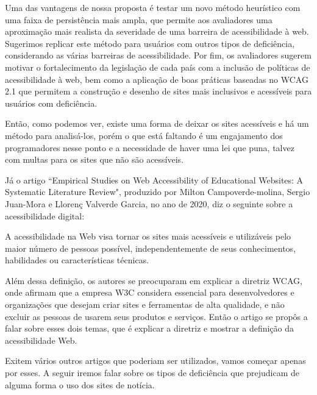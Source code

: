 \documentclass[a4paper]{article}
\begin{document}
\begin{titlepage}
\hspace{0.19\textwidth} %
\begin{minipage}{0.75\textwidth}
	\fontsize{10pt}{0pt}\selectfont
	Uma das vantagens de nossa proposta é testar um novo método heurístico com uma faixa de persistência mais ampla, que permite aos avaliadores uma aproximação mais realista da severidade de uma barreira de acessibilidade à web. Sugerimos replicar este método para usuários com outros tipos de deficiência, considerando as várias barreiras de acessibilidade. Por fim, os avaliadores sugerem motivar o fortalecimento da legislação de cada país com a inclusão de políticas de acessibilidade à web, bem como a aplicação de boas práticas baseadas no WCAG 2.1 que permitem a construção e desenho de sites mais inclusivos e acessíveis para usuários com deficiência.\\[0.5cm]
\end{minipage}

Então, como podemos ver, existe uma forma de deixar os sites acessíveis e há um método para analisá-los, porém o que está faltando é um engajamento dos programadores nesse ponto e a necessidade de haver uma lei que puna, talvez com multas para os sites que não são acessíveis.

Já o artigo “Empirical Studies on Web Accessibility of Educational Websites: A Systematic Literature Review", produzido por Milton Campoverde-molina, Sergio Juan-Mora e Llorenç Valverde Garcia, no ano de 2020, diz o seguinte sobre a acessibilidade digital:\\[0.5cm]

\hspace{0.19\textwidth} %
\begin{minipage}{0.75\textwidth}
	\fontsize{10pt}{0pt}\selectfont
	A acessibilidade na Web visa tornar os sites mais acessíveis e utilizáveis pelo maior número de pessoas possível, independentemente de seus conhecimentos, habilidades ou características técnicas.\\[0.5cm]
\end{minipage}

Além dessa definição, os autores se preocuparam em explicar a diretriz WCAG, onde afirmam que a empresa W3C considera essencial para desenvolvedores e organizações que desejam criar sites e ferramentas de alta qualidade, e não excluir as pessoas de usarem seus produtos e serviços. Então o artigo se propôs a falar sobre esses dois temas, que é explicar a diretriz e mostrar a definição da acessibilidade Web.

Exitem vários outros artigos que poderiam ser utilizados, vamos começar apenas por esses. A seguir iremos falar sobre os tipos de deficiência que prejudicam de alguma forma o uso dos sites de notícia.

\end{titlepage}
\end{document}
